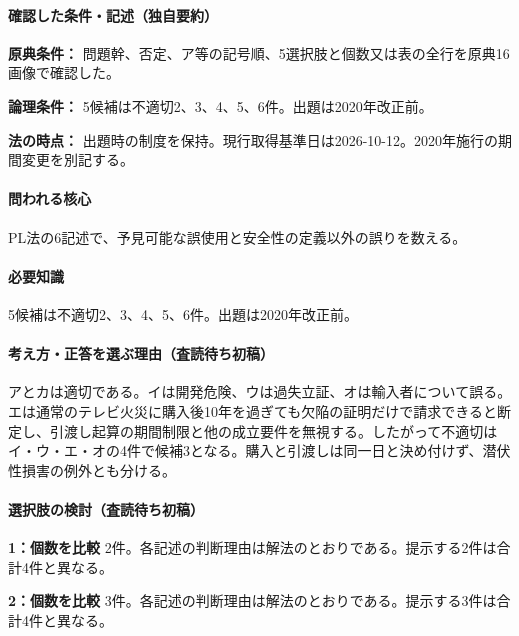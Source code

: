 \paragraph{確認した条件・記述（独自要約）}\mbox{}\par

\noindent\textbf{原典条件：} 問題幹、否定、ア等の記号順、5選択肢と個数又は表の全行を原典16画像で確認した。\par

\noindent\textbf{論理条件：} 5候補は不適切2、3、4、5、6件。出題は2020年改正前。\par

\noindent\textbf{法の時点：} 出題時の制度を保持。現行取得基準日は2026-10-12。2020年施行の期間変更を別記する。\par

\paragraph{問われる核心} PL法の6記述で、予見可能な誤使用と安全性の定義以外の誤りを数える。

\paragraph{必要知識} 5候補は不適切2、3、4、5、6件。出題は2020年改正前。

\paragraph{考え方・正答を選ぶ理由（査読待ち初稿）} アとカは適切である。イは開発危険、ウは過失立証、オは輸入者について誤る。エは通常のテレビ火災に購入後10年を過ぎても欠陥の証明だけで請求できると断定し、引渡し起算の期間制限と他の成立要件を無視する。したがって不適切はイ・ウ・エ・オの4件で候補3となる。購入と引渡しは同一日と決め付けず、潜伏性損害の例外とも分ける。

\paragraph{選択肢の検討（査読待ち初稿）}\mbox{}\par

\noindent\textbf{1：個数を比較} 2件。各記述の判断理由は解法のとおりである。提示する2件は合計4件と異なる。\par

\noindent\textbf{2：個数を比較} 3件。各記述の判断理由は解法のとおりである。提示する3件は合計4件と異なる。\par


